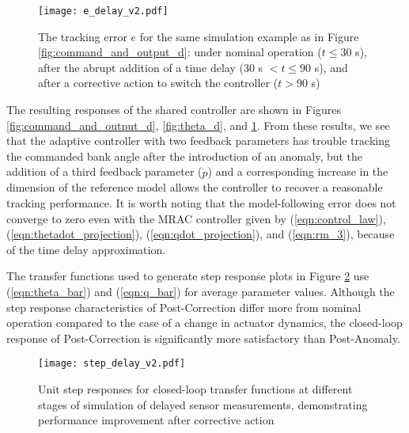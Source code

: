 \begin{figure}[h!]
	\centering
	\texttt{[image: e\_delay\_v2.pdf]}
	\caption{The tracking error $e$ for the same simulation example as in Figure \ref{fig:command_and_output_d}: under nominal operation ($t \leq 30$ s), after the abrupt addition of a time delay ($30$ s $< t \leq 90$ s), and after a corrective action to switch the controller ($t > 90$ s)}
	\label{fig:error_d}
\end{figure}

The resulting responses of the shared controller are shown in Figures \ref{fig:command_and_output_d}, \ref{fig:theta_d}, and \ref{fig:error_d}. From these results, we see that the adaptive controller with two feedback parameters has trouble tracking the commanded bank angle after the introduction of an anomaly, but the addition of a third feedback parameter ($\hat{\dot{p}}$) and a corresponding increase in the dimension of the reference model allows the controller to recover a reasonable tracking performance. It is worth noting that the model-following error does not converge to zero even with the MRAC controller given by (\ref{eqn:control_law}), (\ref{eqn:thetadot_projection}), (\ref{eqn:qdot_projection}), and (\ref{eqn:rm_3}), because of the time delay approximation. 

The transfer functions used to generate step response plots in Figure \ref{fig:step_delay} use (\ref{eqn:theta_bar}) and (\ref{eqn:q_bar}) for average parameter values. Although the step response characteristics of Post-Correction differ more from nominal operation compared to the case of a change in actuator dynamics, the closed-loop response of Post-Correction is significantly more satisfactory than Post-Anomaly.

\begin{figure}[h!]
	\centering
	\texttt{[image: step\_delay\_v2.pdf]}
	\caption{Unit step responses for closed-loop transfer functions at different stages of simulation of delayed sensor measurements, demonstrating performance improvement after corrective action}
	\label{fig:step_delay}
\end{figure}
\clearpage


